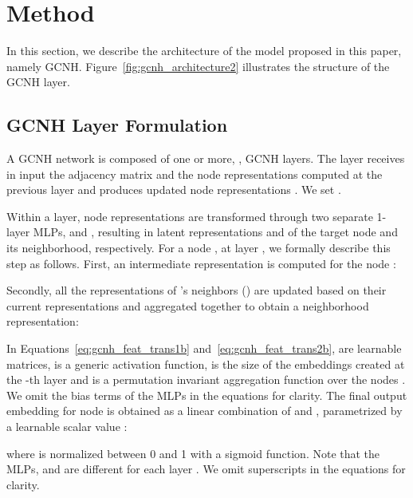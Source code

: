 \documentclass[conference]{IEEEtran}
\begin{document}
\section{Method}\label{sec:method}
In this section, we describe the architecture of the model proposed in this paper, namely GCNH. Figure~\ref{fig:gcnh_architecture2} illustrates the structure of the GCNH layer.

\subsection{GCNH Layer Formulation}
A GCNH network is composed of one or more, , GCNH layers.
The  layer receives in input the adjacency matrix and the node representations computed at the previous layer   and produces updated node representations . We set .

Within a layer, node representations are transformed through two separate 1-layer MLPs,  and , 
resulting in latent representations  and  of the target node and its neighborhood, respectively.
For a node , at layer , we formally describe this step as follows. First, an intermediate representation is computed for the node :

Secondly, all the representations of 's neighbors () are  updated based on their current representations  and aggregated together to obtain a neighborhood representation:

In Equations~\ref{eq:gcnh_feat_trans1b} and~\ref{eq:gcnh_feat_trans2b},  are learnable matrices,  is a generic activation function,  is the size of the embeddings created at the -th layer and  is a permutation invariant aggregation function over the nodes . We omit the bias terms of the MLPs in the equations for clarity.
The final output embedding for node  is obtained as a linear combination of  and , parametrized by a learnable scalar value :

where  is normalized between 0 and 1 with a sigmoid function.
Note that the MLPs,  and  are different for each layer . We omit superscripts in the equations for clarity.
\end{document}
